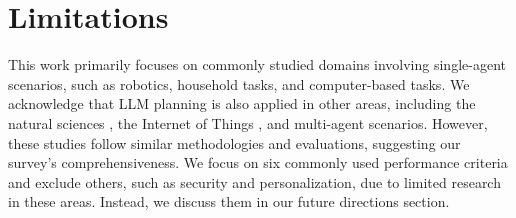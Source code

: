 \section{Limitations} \label{sec:limitation}

This work primarily focuses on commonly studied domains involving single-agent scenarios, such as robotics, household tasks, and computer-based tasks. We acknowledge that LLM planning is also applied in other areas, including the natural sciences \cite{o2023bioplanner, liu2024multimodal}, the Internet of Things \cite{cui2024llmind}, and multi-agent scenarios. However, these studies follow similar methodologies and evaluations, suggesting our survey's comprehensiveness. We focus on six commonly used performance criteria and exclude others, such as security and personalization, due to limited research in these areas. Instead, we discuss them in our future directions section.

